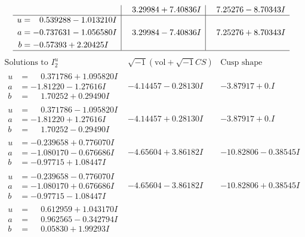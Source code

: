 \documentclass[1p]{elsarticle_modified}
\theoremstyle{definition}
\newcommand{\I}{\sqrt{-1}}
\begin{document}
$$\begin{array}{c|c|c}
 & \phantom{-}3.29984 + 7.40836 I & \phantom{-}7.25276 - 8.70343 I \\ \hline\begin{aligned}
u &= \phantom{-}0.539288 - 1.013210 I \\
a &= -0.737631 - 1.056580 I \\
b &= -0.57393 + 2.20425 I\end{aligned}
 & \phantom{-}3.29984 - 7.40836 I & \phantom{-}7.25276 + 8.70343 I\\
 \hline 
 \end{array}$$\newpage$$\begin{array}{c|c|c}  
\text{Solutions to }I^u_{2}& \I (\text{vol} + \sqrt{-1}CS) & \text{Cusp shape}\\
 \hline 
\begin{aligned}
u &= \phantom{-}0.371786 + 1.095820 I \\
a &= -1.81220 - 1.27616 I \\
b &= \phantom{-}1.70252 + 0.29490 I\end{aligned}
 & -4.14457 - 0.28130 I & -3.87917 + 0. I\phantom{ +0.000000I} \\ \hline\begin{aligned}
u &= \phantom{-}0.371786 - 1.095820 I \\
a &= -1.81220 + 1.27616 I \\
b &= \phantom{-}1.70252 - 0.29490 I\end{aligned}
 & -4.14457 + 0.28130 I & -3.87917 + 0. I\phantom{ +0.000000I} \\ \hline\begin{aligned}
u &= -0.239658 + 0.776070 I \\
a &= -1.080170 - 0.676686 I \\
b &= -0.97715 + 1.08447 I\end{aligned}
 & -4.65604 + 3.86182 I & -10.82806 - 0.38545 I \\ \hline\begin{aligned}
u &= -0.239658 - 0.776070 I \\
a &= -1.080170 + 0.676686 I \\
b &= -0.97715 - 1.08447 I\end{aligned}
 & -4.65604 - 3.86182 I & -10.82806 + 0.38545 I \\ \hline\begin{aligned}
u &= \phantom{-}0.612959 + 1.043170 I \\
a &= \phantom{-}0.962565 - 0.342794 I \\
b &= \phantom{-}0.05830 + 1.99293 I\end{aligned}

\end{array}$$
\end{document}
